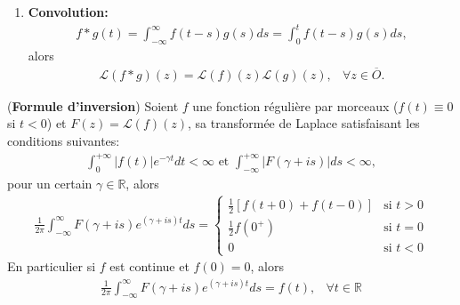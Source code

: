 \begin{myTheorem}
\begin{enumerate}
		\item \textbf{Convolution:}
		\begin{eqnarray*}
			f*g(t)=\int_{-\infty}^{\infty}f(t-s)g(s)ds=\int_0^{t}f(t-s)g(s)ds,
		\end{eqnarray*}
		alors
		\begin{eqnarray}
			\mathcal L(f*g)(z)=\mathcal L(f)(z)\mathcal L(g)(z),&\forall z\in\overline O.
		\end{eqnarray}
	\end{enumerate}
\end{myTheorem}

\begin{myTheorem}
	(\textbf{Formule d'inversion})
	Soient $f$ une fonction régulière par morceaux ($f(t)\equiv0$ si $t<0$) et $F(z)=\mathcal L(f)(z)$, sa transformée de Laplace satisfaisant les conditions suivantes:
	\begin{eqnarray*}
		\int_{0}^{+\infty}|f(t)|e^{-\gamma t}dt<\infty
		\text{ et }
		\int_{-\infty}^{+\infty}|F(\gamma + is)|ds<\infty,
	\end{eqnarray*}
	pour un certain $\gamma\in\mathbb R$, alors
	\begin{eqnarray}
		\frac{1}{2\pi}\int_{-\infty}^{\infty}F(\gamma+is)e^{(\gamma+is)t}ds=
		\begin{cases}
			\frac{1}{2}\left[f(t+0)+f(t-0)\right]&\text{si }t>0
			\\
			\frac{1}{2}f(0^+)&\text{si }t=0
			\\
			0&\text{si }t<0
		\end{cases}
	\end{eqnarray}
	En particulier si $f$ est continue et $f(0)=0$, alors
	\begin{eqnarray}
		\frac{1}{2\pi}\int_{-\infty}^{\infty}F(\gamma+is)e^{(\gamma+is)t}ds=f(t),&\forall t\in\mathbb R
	\end{eqnarray}
\end{myTheorem}
